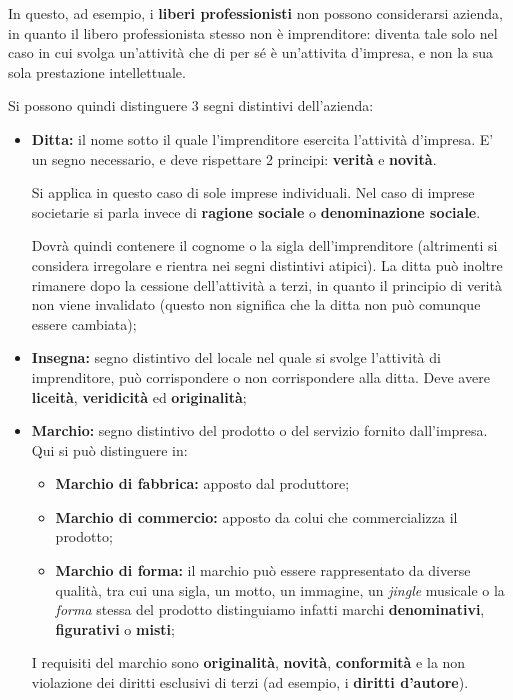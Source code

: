 \documentclass[a4paper,11pt]{article}
\begin{document}
In questo, ad esempio, i \textbf{liberi professionisti} non possono considerarsi azienda, in quanto il libero professionista stesso non è imprenditore: diventa tale solo nel caso in cui svolga un'attività che di per sé è un'attivita d'impresa, e non la sua sola prestazione intellettuale.

Si possono quindi distinguere 3 segni distintivi dell'azienda:
\begin{itemize}
	\item \textbf{Ditta:} il nome sotto il quale l'imprenditore esercita l'attività d'impresa.
		E' un segno necessario, e deve rispettare 2 principi: \textbf{verità} e \textbf{novità}. 
		
		Si applica in questo caso di sole imprese individuali.
		Nel caso di imprese societarie si parla invece di \textbf{ragione sociale} o \textbf{denominazione sociale}.

		Dovrà quindi contenere il cognome o la sigla dell'imprenditore (altrimenti si considera irregolare e rientra nei segni distintivi atipici).
		La ditta può inoltre rimanere dopo la cessione dell'attività a terzi, in quanto il principio di verità non viene invalidato (questo non significa che la ditta non può comunque essere cambiata);

	\item \textbf{Insegna:} segno distintivo del locale nel quale si svolge l'attività di imprenditore, può corrispondere o non corrispondere alla ditta. Deve avere \textbf{liceità}, \textbf{veridicità} ed \textbf{originalità};

	\item \textbf{Marchio:} segno distintivo del prodotto o del servizio fornito dall'impresa. Qui si può distinguere in:
		\begin{itemize}
			\item \textbf{Marchio di fabbrica:} apposto dal produttore;
			\item \textbf{Marchio di commercio:} apposto da colui che commercializza il prodotto;
			\item \textbf{Marchio di forma:} il marchio può essere rappresentato da diverse qualità, tra cui una sigla, un motto, un immagine, un \textit{jingle} musicale o la \textit{forma} stessa del prodotto distinguiamo infatti marchi \textbf{denominativi}, \textbf{figurativi} o \textbf{misti};
		\end{itemize}
		I requisiti del marchio sono \textbf{originalità}, \textbf{novità}, \textbf{conformità} e la non violazione dei diritti esclusivi di terzi (ad esempio, i \textbf{diritti d'autore}).


\end{itemize}
\end{document}
